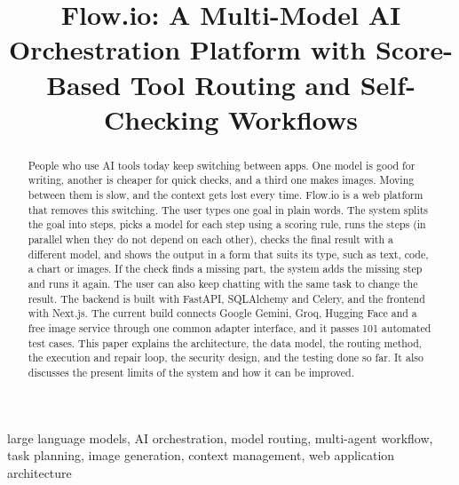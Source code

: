\documentclass[conference]{IEEEtran}
\begin{document}
\title{Flow.io: A Multi-Model AI Orchestration Platform with Score-Based Tool Routing and Self-Checking Workflows}

\author{
\and
{}
}

\maketitle

\begin{abstract}
People who use AI tools today keep switching between apps. One model is good for writing, another is
cheaper for quick checks, and a third one makes images. Moving between them is slow, and the context
gets lost every time. Flow.io is a web platform that removes this switching. The user types one goal in
plain words. The system splits the goal into steps, picks a model for each step using a scoring rule,
runs the steps (in parallel when they do not depend on each other), checks the final result with a
different model, and shows the output in a form that suits its type, such as text, code, a chart or
images. If the check finds a missing part, the system adds the missing step and runs it again. The user
can also keep chatting with the same task to change the result. The backend is built with FastAPI,
SQLAlchemy and Celery, and the frontend with Next.js. The current build connects Google Gemini, Groq,
Hugging Face and a free image service through one common adapter interface, and it passes 101 automated
test cases. This paper explains the architecture, the data model, the routing method, the execution and
repair loop, the security design, and the testing done so far. It also discusses the present limits of
the system and how it can be improved.
\end{abstract}

\begin{IEEEkeywords}
large language models, AI orchestration, model routing, multi-agent workflow, task planning, image
generation, context management, web application architecture
\end{IEEEkeywords}
\end{document}
